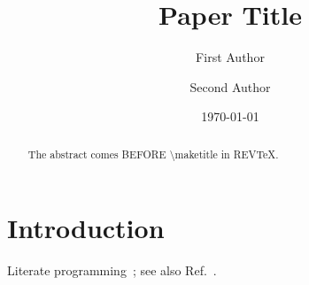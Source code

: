 \documentclass[aps,prl,reprint]{revtex4-2}
\begin{document}
\title{Paper Title}
\author{First Author}
\author{Second Author}
\date{\today}
\begin{abstract}
The abstract comes BEFORE \textbackslash maketitle in REVTeX.
\end{abstract}
\maketitle
\section{Introduction}
Literate programming~\cite{knuth1984literate}; see also Ref.~\cite{lamport1994latex}.
\end{document}
